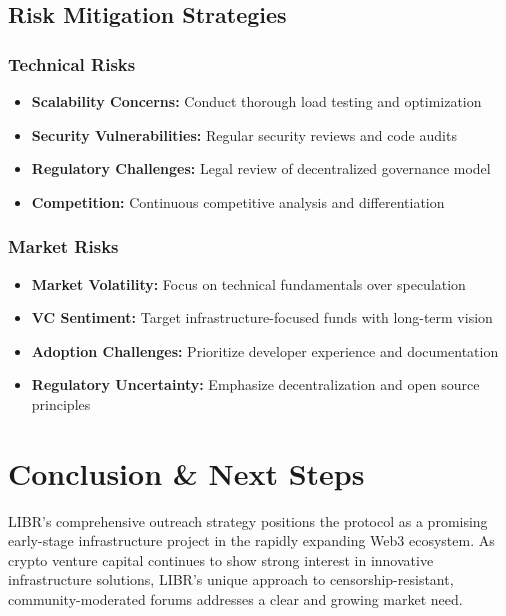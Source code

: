 \documentclass[12pt,a4paper]{article}
\begin{document}
\begin{itemize}
\subsection{Risk Mitigation Strategies}

\subsubsection{Technical Risks}
\begin{itemize}
    \item \textbf{Scalability Concerns:} Conduct thorough load testing and optimization
    \item \textbf{Security Vulnerabilities:} Regular security reviews and code audits
    \item \textbf{Regulatory Challenges:} Legal review of decentralized governance model
    \item \textbf{Competition:} Continuous competitive analysis and differentiation
\end{itemize}

\subsubsection{Market Risks}
\begin{itemize}
    \item \textbf{Market Volatility:} Focus on technical fundamentals over speculation
    \item \textbf{VC Sentiment:} Target infrastructure-focused funds with long-term vision
    \item \textbf{Adoption Challenges:} Prioritize developer experience and documentation
    \item \textbf{Regulatory Uncertainty:} Emphasize decentralization and open source principles
\end{itemize}

\section{Conclusion \& Next Steps}

LIBR's comprehensive outreach strategy positions the protocol as a promising early-stage infrastructure project in the rapidly expanding Web3 ecosystem. As crypto venture capital continues to show strong interest in innovative infrastructure solutions, LIBR's unique approach to censorship-resistant, community-moderated forums addresses a clear and growing market need.


\end{itemize}
\end{document}
